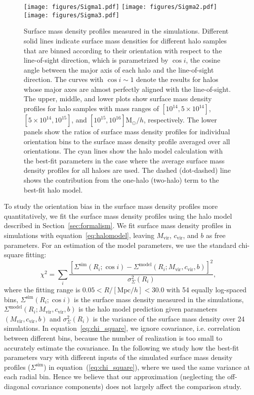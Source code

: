 \documentclass[a4paper,fleqn,usenatbib]{mnras}
\newcommand{\beq}{\begin{equation}}
\newcommand{\eeq}{\end{equation}}
\newcommand{\vir}{\mathrm{vir}}
\newcommand{\Mpc}{\mathrm{Mpc}}
\newcommand{\Msun}{\mathrm{M}_\odot}
\begin{document}
\begin{figure}
\texttt{[image: figures/Sigma1.pdf]}
\texttt{[image: figures/Sigma2.pdf]}
\texttt{[image: figures/Sigma3.pdf]}
\caption{Surface mass density profiles measured in the simulations.
  Different solid lines indicate surface mass densities for
  different halo samples that are binned according to their
  orientation with respect to the line-of-sight direction,
  which is parametrized by $\cos i$, the cosine angle between the major axis of
  each halo and the line-of-sight direction. The curves with
  $\cos i\sim 1$ denote the results for halos whose major axes
  are almost perfectly aligned with the line-of-sight.
  The upper, middle, and lower plots show surface mass density
  profiles for halo samples with mass ranges of
  $[10^{14}, 5 \times 10^{14}]$, $[5 \times 10^{14}, 10^{15}]$,
  and $[10^{15}, 10^{16}] \Msun /h$, respectively.
  The lower panels show the ratios of surface mass density profiles for
  individual orientation bins to the surface mass density profile
  averaged over all orientations. The cyan lines show the halo model
  calculation with the best-fit parameters in the case where the
  average surface mass density profiles for all haloes are used.
  The dashed (dot-dashed) line shows the contribution from the
  one-halo (two-halo) term to the best-fit halo model.}
\label{fig:Sigma}
\end{figure}

To study the orientation bias
in the surface mass density profiles more quantitatively,
we fit the surface mass density profiles using the halo model described
in Section~\ref{sec:formalism}. We fit surface mass density profiles
in simulations with equation~\eqref{eq:halomodel}, leaving
$M_\vir$, $c_\vir$, and $b$ as free parameters. For
an estimation of the model parameters,
we use the standard chi-square fitting:
\beq
\chi^2 = \sum_i \frac{[ \Sigma^\mathrm{sim} (R_i;\cos i) -
\Sigma^\mathrm{model} (R_i;M_\vir, c_\vir, b) ]^2}{\sigma^2_\Sigma (R_i)} ,
\label{eq:chi_square}
\eeq
where the fitting range is $0.05 < R/[\Mpc/h] < 30.0$ with
54 equally log-spaced bins, $\Sigma^\mathrm{sim} (R_i;\cos i)$ is the surface
mass density measured in the simulations,
$\Sigma^\mathrm{model} (R_i;M_\vir, c_\vir, b)$ is the halo model
prediction given parameters $(M_\vir, c_\vir, b)$ and
$\sigma^2_\Sigma (R_i)$ is the variance of the surface mass density
over 24 simulations.
In equation~\eqref{eq:chi_square}, we ignore covariance,
i.e. correlation between different bins,
because the number of realization is too small to accurately estimate the covariance.
In the following we study how the best-fit parameters vary with different inputs of the simulated
surface mass density profiles ($\Sigma^{\mathrm{sim}}$) in equation~(\ref{eq:chi_square}),
where we used the same variance at each radial bin.
Hence we believe that our approximation (neglecting
the off-diagonal covariance components) does not largely affect the comparison study.
\end{document}
